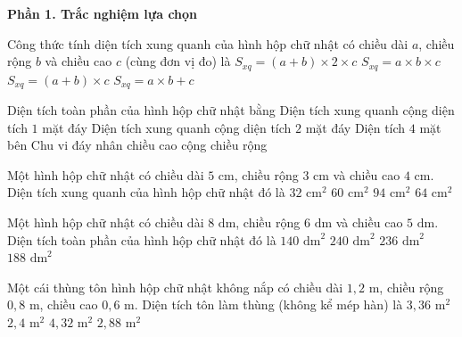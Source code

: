 \textbf{Phần 1. Trắc nghiệm lựa chọn}

\begin{ex} %
Công thức tính diện tích xung quanh của hình hộp chữ nhật có chiều dài $a$, chiều rộng $b$ và chiều cao $c$ (cùng đơn vị đo) là
\choice
{\True $S_{xq} = (a + b) \times 2 \times c$}
{$S_{xq} = a \times b \times c$}
{$S_{xq} = (a + b) \times c$}
{$S_{xq} = a \times b + c$}
\end{ex}

\begin{ex} %
Diện tích toàn phần của hình hộp chữ nhật bằng
\choice
{Diện tích xung quanh cộng diện tích $1$ mặt đáy}
{\True Diện tích xung quanh cộng diện tích $2$ mặt đáy}
{Diện tích $4$ mặt bên}
{Chu vi đáy nhân chiều cao cộng chiều rộng}
\end{ex}

\begin{ex} %
Một hình hộp chữ nhật có chiều dài $5\text{ cm}$, chiều rộng $3\text{ cm}$ và chiều cao $4\text{ cm}$. Diện tích xung quanh của hình hộp chữ nhật đó là
\choice
{$32\text{ cm}^2$}
{$60\text{ cm}^2$}
{$94\text{ cm}^2$}
{\True $64\text{ cm}^2$}
\end{ex}

\begin{ex} %
Một hình hộp chữ nhật có chiều dài $8\text{ dm}$, chiều rộng $6\text{ dm}$ và chiều cao $5\text{ dm}$. Diện tích toàn phần của hình hộp chữ nhật đó là
\choice
{$140\text{ dm}^2$}
{$240\text{ dm}^2$}
{\True $236\text{ dm}^2$}
{$188\text{ dm}^2$}
\end{ex}

\begin{ex} %
Một cái thùng tôn hình hộp chữ nhật không nắp có chiều dài $1{,}2\text{ m}$, chiều rộng $0{,}8\text{ m}$, chiều cao $0{,}6\text{ m}$. Diện tích tôn làm thùng (không kể mép hàn) là
\choice
{\True $3{,}36\text{ m}^2$}
{$2{,}4\text{ m}^2$}
{$4{,}32\text{ m}^2$}
{$2{,}88\text{ m}^2$}
\end{ex}

